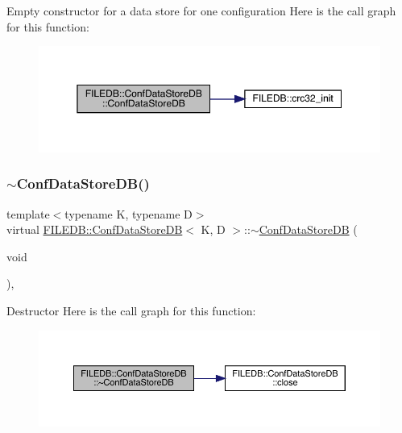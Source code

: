 Empty constructor for a data store for one configuration Here is the call graph for this function\+:
\nopagebreak
\begin{figure}[H]
\begin{center}
\leavevmode
\includegraphics[width=350pt]{d8/d19/classFILEDB_1_1ConfDataStoreDB_a575d901daeccae08bcda5b2a60681e1b_cgraph}
\end{center}
\end{figure}
\mbox{\label{classFILEDB_1_1ConfDataStoreDB_a39b48750dbc9bd0d4ca8c9787edee897}} 
\subsubsection{\texorpdfstring{$\sim$ConfDataStoreDB()}{~ConfDataStoreDB()}\hspace{0.1cm}{\footnotesize\ttfamily [3/3]}}
{\footnotesize\ttfamily template$<$typename K, typename D$>$ \\
virtual \mbox{\hyperlink{classFILEDB_1_1ConfDataStoreDB}{F\+I\+L\+E\+D\+B\+::\+Conf\+Data\+Store\+DB}}$<$ K, D $>$\+::$\sim$\mbox{\hyperlink{classFILEDB_1_1ConfDataStoreDB}{Conf\+Data\+Store\+DB}} (\begin{DoxyParamCaption}\item[{void}]{ }\end{DoxyParamCaption})\hspace{0.3cm}{\ttfamily [inline]}, {\ttfamily [virtual]}}

Destructor Here is the call graph for this function\+:
\nopagebreak
\begin{figure}[H]
\begin{center}
\leavevmode
\includegraphics[width=350pt]{d8/d19/classFILEDB_1_1ConfDataStoreDB_a39b48750dbc9bd0d4ca8c9787edee897_cgraph}
\end{center}
\end{figure}


